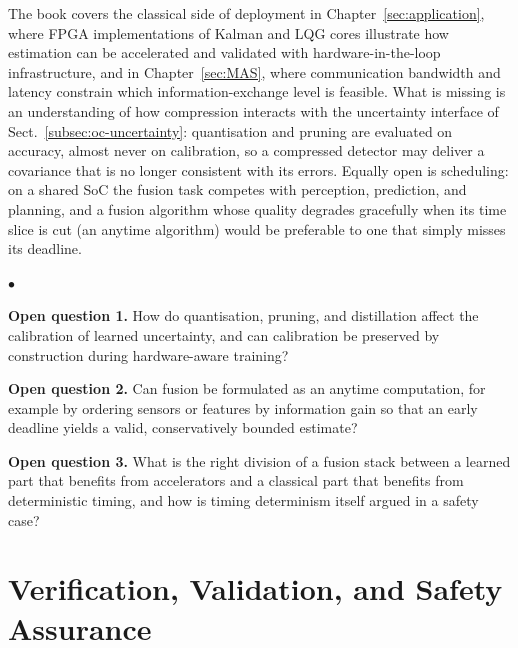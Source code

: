 \documentclass[graybox,envcountchap]{style/SNmono}
\newenvironment{list4a}{
  \begin{list}{$\bullet$}{
      \setlength{\itemsep}{0.05cm}
      \setlength{\labelsep}{0.2cm}
      \setlength{\labelwidth}{0.3cm}
      \setlength{\parsep}{0in}
      \setlength{\parskip}{0in}
      \setlength{\topsep}{0in}
      \setlength{\partopsep}{0in}
      \setlength{\leftmargin}{0.16in}}}
      {\end{list}}
\begin{document}
The book covers the classical side of deployment in Chapter~\ref{sec:application}, where FPGA implementations of Kalman and LQG cores illustrate how estimation can be accelerated and validated with hardware-in-the-loop infrastructure, and in Chapter~\ref{sec:MAS}, where communication bandwidth and latency constrain which information-exchange level is feasible. What is missing is an understanding of how compression interacts with the uncertainty interface of Sect.~\ref{subsec:oc-uncertainty}: quantisation and pruning are evaluated on accuracy, almost never on calibration, so a compressed detector may deliver a covariance that is no longer consistent with its errors. Equally open is scheduling: on a shared SoC the fusion task competes with perception, prediction, and planning, and a fusion algorithm whose quality degrades gracefully when its time slice is cut (an anytime algorithm) would be preferable to one that simply misses its deadline.

\begin{list4a}
    \item \textbf{Open question 1.} How do quantisation, pruning, and distillation affect the calibration of learned uncertainty, and can calibration be preserved by construction during hardware-aware training?
    \item \textbf{Open question 2.} Can fusion be formulated as an anytime computation, for example by ordering sensors or features by information gain so that an early deadline yields a valid, conservatively bounded estimate?
    \item \textbf{Open question 3.} What is the right division of a fusion stack between a learned part that benefits from accelerators and a classical part that benefits from deterministic timing, and how is timing determinism itself argued in a safety case?
\end{list4a}

\section{Verification, Validation, and Safety Assurance}
\label{subsec:oc-vv}
\end{document}
